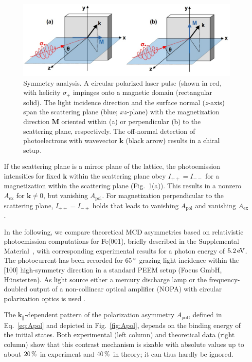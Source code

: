 \documentclass[prl,twocolumn,floatfix,superscriptaddress,aps]{revtex4-2}
\renewcommand{\vec}[1]{\boldsymbol{#1}}
\begin{document}
\begin{figure}
    \centering
    \includegraphics[width = \columnwidth]{symmetry}
    \caption{Symmetry analysis. A circular polarized laser pulse (shown in red, with helicity $\sigma_{+}$ impinges onto a magnetic domain (rectangular solid). The light incidence direction and the surface normal ($z$-axis) span the scattering plane (blue; $xz$-plane) with the magnetization direction $\vec{M}$ oriented within (a) or perpendicular (b) to the scattering plane, respectively. The off-normal detection of photoelectrons with wavevector $\vec{k}$ (black arrow) results in a chiral setup.}
    \label{fig:symmetry}
\end{figure}

If the scattering plane is a mirror plane of the lattice, the photoemission intensities for fixed $\vec{k}$ within the scattering plane obey $I_{+ +} = I_{- -}$ for a magnetization within the scattering plane (Fig.~\ref{fig:symmetry}(a)). This results in a nonzero $A_{\mathrm{ex}}$ for $\vec{k}\neq 0$, but vanishing $A_{\mathrm{pol}}$. For magnetization perpendicular to the scattering plane, $I_{+ +} = I_{- +}$ holds that leads to vanishing $A_{\mathrm{pol}}$ and vanishing $A_{\mathrm{ex}}$.
 

In the following, we compare theoretical MCD asymmetries based on relativistic photoemission computations for Fe(001), briefly described in the Supplemental Material~\cite{Supplement}, with corresponding experimental results for a photon energy of $\unit[5.2]{eV}$. The photocurrent has been recorded for $\unit[65]{^{\circ}}$ grazing light incidence within the [100] high-symmetry direction in a standard PEEM setup (Focus GmbH, Hünstetten). As light source either a mercury discharge lamp or the frequency-doubled output of a non-collinear optical amplifier (NOPA) with circular polarization optics is used \cite{duncker2012,gillmeister2020, paleschke2021}. 

The $\vec{k}_{\parallel}$-dependent pattern of the polarization asymmetry $A_{\mathrm{pol}}$, defined in Eq.~\eqref{eq:Apol} and depicted in Fig.~\ref{fig:Apol}, depends on the binding energy of the initial states. Both experimental (left column) and theoretical data (right column) show that this contrast mechanism is sizable with absolute values up to about $\unit[20]{\%}$ in experiment and $\unit[40]{\%}$ in theory; it can thus hardly be ignored. 
\end{document}

